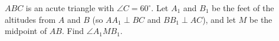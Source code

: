 $ABC$ is an acute triangle with $\angle C=60^\circ$. Let $A_1$ and $B_1$ be the feet of the altitudes from $A$ and $B$ (so $AA_1\perp BC$ and $BB_1\perp AC$), and let $M$ be the midpoint of $AB$. Find $\angle A_1MB_1$.
